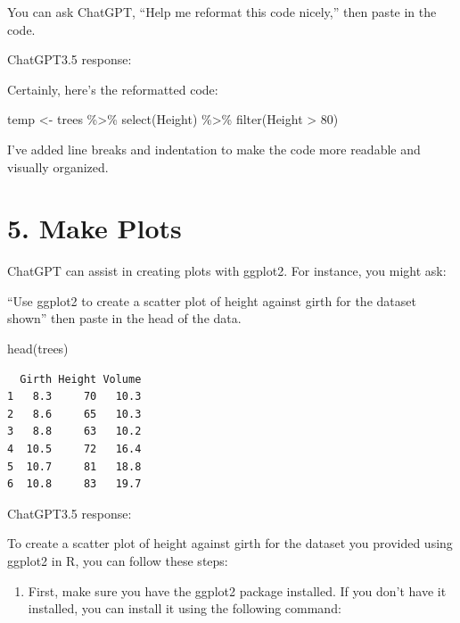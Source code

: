 \documentclass[
  letterpaper,
  DIV=11,
  numbers=noendperiod]{scrreprt}
\newenvironment{Shaded}{\begin{snugshade}}{\end{snugshade}}
\newcommand{\DecValTok}[1]{\textcolor[rgb]{0.68,0.00,0.00}{#1}}
\newcommand{\FunctionTok}[1]{\textcolor[rgb]{0.28,0.35,0.67}{#1}}
\newcommand{\NormalTok}[1]{\textcolor[rgb]{0.00,0.23,0.31}{#1}}
\newcommand{\OtherTok}[1]{\textcolor[rgb]{0.00,0.23,0.31}{#1}}
\newcommand{\SpecialCharTok}[1]{\textcolor[rgb]{0.37,0.37,0.37}{#1}}
\providecommand{\tightlist}{%
  \setlength{\itemsep}{0pt}\setlength{\parskip}{0pt}}\usepackage{longtable,booktabs,array}
\begin{document}
You can ask ChatGPT, ``Help me reformat this code nicely,'' then paste
in the code.

ChatGPT3.5 response:

\leavevmode{}%
Certainly, here's the reformatted code:

\begin{Shaded}
\begin{Highlighting}[]
\NormalTok{temp }\OtherTok{\textless{}{-}}\NormalTok{ trees }\SpecialCharTok{\%\textgreater{}\%}
  \FunctionTok{select}\NormalTok{(Height) }\SpecialCharTok{\%\textgreater{}\%}
  \FunctionTok{filter}\NormalTok{(Height }\SpecialCharTok{\textgreater{}} \DecValTok{80}\NormalTok{)}
\end{Highlighting}
\end{Shaded}

I've added line breaks and indentation to make the code more readable
and visually organized.

\hypertarget{make-plots}{%
\section{5. Make Plots}\label{make-plots}}

ChatGPT can assist in creating plots with ggplot2. For instance, you
might ask:

``Use ggplot2 to create a scatter plot of height against girth for the
dataset shown'' then paste in the head of the data.

\begin{Shaded}
\begin{Highlighting}[]
\FunctionTok{head}\NormalTok{(trees)}
\end{Highlighting}
\end{Shaded}

\begin{verbatim}
  Girth Height Volume
1   8.3     70   10.3
2   8.6     65   10.3
3   8.8     63   10.2
4  10.5     72   16.4
5  10.7     81   18.8
6  10.8     83   19.7
\end{verbatim}

ChatGPT3.5 response:

\leavevmode{}%
To create a scatter plot of height against girth for the dataset you
provided using ggplot2 in R, you can follow these steps:

\begin{enumerate}
\def\labelenumi{\arabic{enumi}.}
\tightlist
\item
  First, make sure you have the ggplot2 package installed. If you don't
  have it installed, you can install it using the following command:
\end{enumerate}
\end{document}
